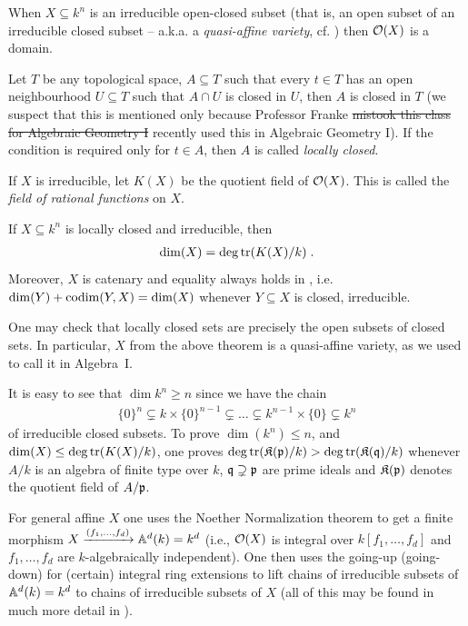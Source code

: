 \documentclass[a4paper,parskip=half,numbers=enddot, DIV=12]{scrreprt}
\begin{document}
\begin{rem}
	When $X\subseteq k^n$ is an irreducible open-closed subset (that is, an open subset of an irreducible closed subset -- a.k.a. a \emph{quasi-affine variety}, cf. \cite[Definition~2.2.1]{alg1}) then $\mathcal{O}(X)$ is a domain. 
\end{rem}
\begin{rem}
	Let $T$ be any topological space, $A\subseteq T$ such that every $t\in T$ has an open neighbourhood $U\subseteq T$ such that $A\cap U$ is closed in $U$, then $A$ is closed in $T$ (we suspect that this is mentioned only because Professor Franke \sout{mistook this class for Algebraic Geometry I} recently used this in Algebraic Geometry I). If the condition is required only for $t\in A$, then $A$ is called \emph{locally closed}.
\end{rem}
If $X$ is irreducible, let $K(X)$ be the quotient field of $\mathcal{O}(X)$. This is called the \emph{field of rational functions} on $X$.
\begin{thm}
	If $X\subseteq k^n$ is locally closed and irreducible, then
	\begin{align*}
	\dim(X) = \deg\operatorname{tr} (K(X)/k)\;.
	\end{align*}
	Moreover, $X$ is catenary and equality always holds in , i.e. $\dim (Y) +\operatorname{codim}(Y,X) = \dim (X)$ whenever $Y\subseteq X$ is closed, irreducible.
\end{thm}
One may check that locally closed sets are precisely the open subsets of closed sets. In particular, $X$ from the above theorem is a quasi-affine variety, as we used to call it in Algebra~I.
\begin{rem}
	It is easy to see that $\dim k^n \geq n$ since we have the chain
	\begin{align*}
	\{0\}^n \subsetneq k\times\{0\}^{n-1} \subsetneq\ldots\subsetneq k^{n-1}\times\{0\} \subsetneq k^n
	\end{align*} of irreducible closed subsets. To prove $\dim(k^n) \leq n$, and $\dim (X) \leq\deg\operatorname{tr}(K(X)/k)$, one proves $\deg\operatorname{tr}(\mathfrak{K}(\mathfrak{p})/k) > \deg\operatorname{tr}(\mathfrak{K}(\mathfrak{q})/k)$ whenever $A/k$ is an algebra of finite type over $k$, $\mathfrak{q}\supsetneq \mathfrak{p}$ are prime ideals and $\mathfrak{K}(\mathfrak{p})$ denotes the quotient field of $A/\mathfrak{p}$. 
	
	For general affine $X$ one uses the Noether Normalization theorem to get a finite morphism $X\xrightarrow{(f_1,\ldots,f_d)} \mathbb{A}^d(k)=k^d$ (i.e., $\mathcal{O}(X)$ is integral over $k[f_1,\ldots,f_d]$ and $f_1,\ldots,f_d$ are $k$-algebraically independent). One then uses the going-up (going-down) for (certain) integral ring extensions to lift chains of irreducible subsets of $\mathbb{A}^d(k)=k^d$ to chains of irreducible subsets of $X$ (all of this may be found in much more detail in \cite[Section~2.4-2.6]{alg1}).
\end{rem}
\end{document}
